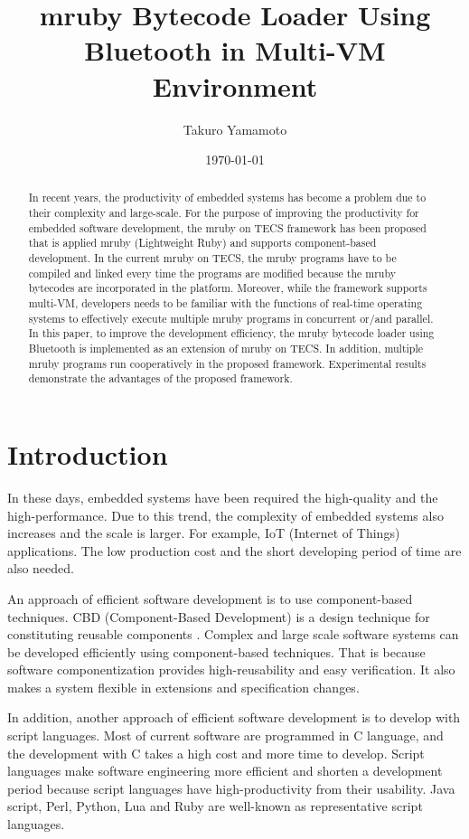 \documentclass[conference,compsoc]{IEEEtran}
\title{mruby Bytecode Loader Using Bluetooth in Multi-VM Environment}
\author{Takuro Yamamoto}
\date{\today}
\begin{document}
\maketitle
\begin{abstract}
In recent years, the productivity of embedded systems has become a problem due to their complexity and large-scale.
For the purpose of improving the productivity for embedded software development, the mruby on TECS framework has been proposed that is applied mruby (Lightweight Ruby) and supports component-based development.
In the current mruby on TECS, the mruby programs have to be compiled and linked every time the programs are modified because the mruby bytecodes are incorporated in the platform.
Moreover, while the framework supports multi-VM, developers needs to be familiar with the functions of real-time operating systems to effectively execute multiple mruby programs in concurrent or/and parallel.
In this paper, to improve the development efficiency, the mruby bytecode loader using Bluetooth is implemented as an extension of mruby on TECS.
In addition, multiple mruby programs run cooperatively in the proposed framework.
Experimental results demonstrate the advantages of the proposed framework.
\end{abstract}
\section{Introduction}
In these days, embedded systems have been required the high-quality and the high-performance.
Due to this trend, the complexity of embedded systems also increases and the scale is larger.
For example, IoT (Internet of Things) applications.
The low production cost and the short developing period of time are also needed.

An approach of efficient software development is to use component-based techniques.
CBD (Component-Based Development) is a design technique for constituting reusable components \cite{Crnkovic:2005:CSE:1062455.1062631}.
Complex and large scale software systems can be developed efficiently using component-based techniques.
That is because software componentization provides high-reusability and easy verification.
It also makes a system flexible in extensions and specification changes.

In addition, another approach of efficient software development is to develop with script languages.
Most of current software are programmed in C language, and the development with C takes a high cost and more time to develop.
Script languages make software engineering more efficient and shorten a development period because script languages have high-productivity from their usability.
Java script, Perl, Python, Lua and Ruby are well-known as representative script languages.
\end{document}
